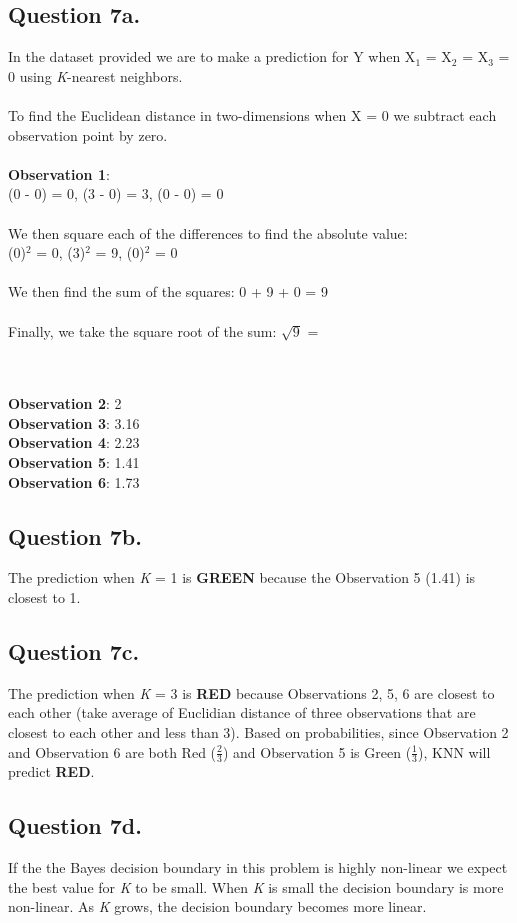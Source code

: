 \documentclass{article}
\begin{document}
\subsection*{Question 7a.}
In the dataset provided we are to make a prediction for Y when X$_{1}$ = X$_{2}$ = X$_{3}$ = 0 using \textit{K}-nearest neighbors. \\ \\
To find the Euclidean distance in two-dimensions when X = 0 we subtract each observation point by zero. \\ \\
\textbf{Observation 1}: \\
(0 - 0) = 0, (3 - 0) = 3, (0 - 0)  = 0 \\ \\
We then square each of the differences to find the absolute value: \\ 
(0)$^{2}$  = 0, (3)$^{2}$ = 9, (0)$^{2}$ = 0 \\ \\
We then find the sum of the squares: 
0 + 9 + 0 = 9 \\ \\
Finally, we take the square root of the sum:
$\sqrt{9}$ = 
\\ \\
\textbf{Observation 2}: 2 \\
\textbf{Observation 3}: 3.16 \\
\textbf{Observation 4}: 2.23 \\
\textbf{Observation 5}: 1.41 \\
\textbf{Observation 6}: 1.73 \\ 

\subsection*{Question 7b.}
The prediction when \textit{K} = 1 is \textbf{GREEN} because the Observation 5 (1.41) is closest to 1. 

\subsection*{Question 7c.} 
The prediction when \textit{K} = 3 is \textbf{RED} because Observations 2, 5, 6 are closest to each other (take average of Euclidian distance of three observations that are closest to each other and less than 3). Based on probabilities, since Observation 2 and Observation 6 are both Red (\(\frac{2}{3}\)) and Observation 5 is Green (\(\frac{1}{3}\)), KNN will predict \textbf{RED}.

\subsection*{Question 7d.}
If the the Bayes decision boundary in this problem is highly non-linear we expect the best value for \textit{K} to be small. When \textit{K} is small the decision boundary is more non-linear. As \textit{K} grows, the decision boundary becomes more linear.
\end{document}
